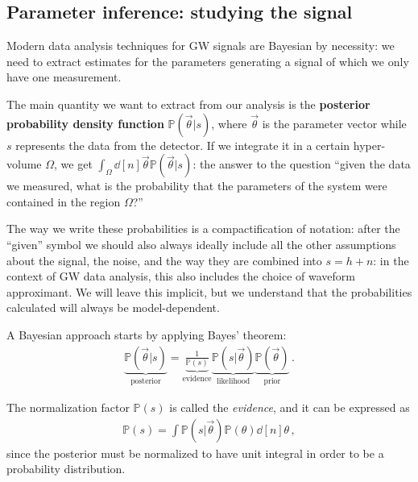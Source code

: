 \documentclass[main.tex]{subfiles}
\begin{document}
\subsection{Parameter inference: studying the signal}

Modern data analysis techniques for \ac{GW} signals are Bayesian by necessity: we need to extract estimates for the parameters generating a signal of which we only have one measurement. 

The main quantity we want to extract from our analysis is the \textbf{posterior probability density function} \(\mathbb{P}(\vec{\theta} | s)\), where \(\vec{\theta}\) is the parameter vector while \(s\) represents the data from the detector. 
If we integrate it in a certain hyper-volume \(\Omega \), we get \(\int_{\Omega } \dd[n]{\vec{\theta}} \mathbb{P}(\vec{\theta} | s)\): the answer to the question ``given the data we measured, what is the probability that the parameters of the system were contained in the region \(\Omega \)?''

The way we write these probabilities is a compactification of notation: 
after the ``given'' symbol we should also always ideally include all the other assumptions about the signal, the noise, and the way they are combined into \(s = h + n\): in the context of \ac{GW} data analysis, this also includes the choice of waveform approximant. 
We will leave this implicit, but we understand that the probabilities calculated will always be model-dependent. 

A Bayesian approach starts by applying Bayes' theorem: 
%
\begin{align}
\underbrace{\mathbb{P}(\vec{\theta}| s )}_{\text{posterior}} = \underbrace{\frac{1}{\mathbb{P}(s)}}_{\text{evidence}} \underbrace{\mathbb{P}(s | \vec{\theta})}_{\text{likelihood}} \underbrace{\mathbb{P}(\vec{\theta})}_{\text{prior}}
\,.
\end{align}
%

The normalization factor \(\mathbb{P}(s)\) is called the \emph{evidence}, and it can be expressed as 
%
\begin{align}
\mathbb{P} (s) = \int \mathbb{P}(s | \vec{\theta}) \mathbb{P}(\theta ) \dd[n]{\theta }
\,,
\end{align}
%
since the posterior must be normalized to have unit integral in order to be a probability distribution. 
\end{document}
